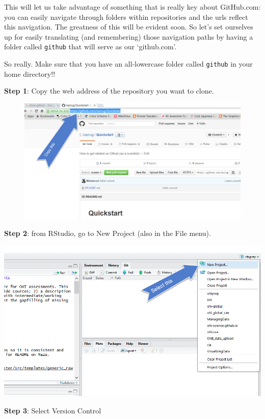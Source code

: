 \documentclass[]{book}
\theoremstyle{definition}
\theoremstyle{definition}
\theoremstyle{definition}
\theoremstyle{remark}
\begin{document}
This will let us take advantage of something that is really key about
GitHub.com: you can easily navigate through folders within repositories
and the urls reflect this navigation. The greatness of this will be
evident soon. So let's set ourselves up for easily translating (and
remembering) those navigation paths by having a folder called
\texttt{github} that will serve as our `github.com'.

So really. Make sure that you have an all-lowercase folder called
\texttt{github} in your home directory!!

\textbf{Step 1}: Copy the web address of the repository you want to
clone.

\begin{figure}
\centering
\includegraphics{img/clone_step1.png}
\caption{}
\end{figure}

\textbf{Step 2}: from RStudio, go to New Project (also in the File
menu).

\includegraphics{img/new_project_1.png}

\textbf{Step 3}: Select Version Control
\end{document}
